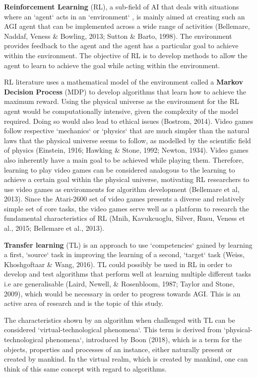 \textbf{Reinforcement Learning} (RL), a sub-field of AI that deals with situations where an `agent` acts in an `environment` , is mainly aimed at creating such an AGI agent that can be implemented across a wide range of activities (Bellemare, Naddaf, Veness \& Bowling, 2013; Sutton \& Barto, 1998). The environment provides feedback to the agent and the agent has a particular goal to achieve within the environment. The objective of RL is to develop methods to allow the agent to learn to achieve the goal while acting within the environment.

RL literature uses a mathematical model of the environment called a \textbf{Markov Decision Process} (MDP) to develop algorithms that learn how to achieve the maximum reward. Using the physical universe as the environment for the RL agent would be computationally intensive, given the complexity of the model required. Doing so would also lead to ethical issues (Bostrom, 2014). Video games follow respective `mechanics` or `physics` that are much simpler than the natural laws that the physical universe seems to follow, as modelled by the scientific field of physics (Einstein, 1916; Hawking \& Stone, 1992; Newton, 1934). Video games also inherently have a main goal to be achieved while playing them. Therefore, learning to play video games can be considered analogous to the learning to achieve a certain goal within the physical universe, motivating RL researchers to use video games as environments for algorithm development (Bellemare et al, 2013). Since the Atari-2600 set of video games presents a diverse and relatively simple set of core tasks, the video games serve well as a platform to research the fundamental characteristics of RL (Mnih, Kavukcuoglu, Silver, Rusu, Veness et al., 2015; Bellemare et al., 2013). 

\textbf{Transfer learning} (TL) is an approach to use `competencies` gained by learning a first, `source` task in improving the learning of a second, `target` task (Weiss, Khoshgoftaar \& Wang, 2016). TL could possibly be used in RL in order to develop and test algorithms that perform well at learning multiple different tasks i.e are generalisable (Laird, Newell, \& Rosenbloom, 1987; Taylor and Stone, 2009), which would be necessary in order to progress towards AGI. This is an active area of research and is the topic of this study. 

The characteristics shown by an algorithm when challenged with TL can be considered `virtual-technological phenomena`. This term is derived from `physical-technological phenomena`, introduced by Boon (2018), which is a term for the objects, properties and processes of an instance, either naturally present or created by mankind. In the virtual realm, which is created by mankind, one can think of this same concept with regard to algorithms.

